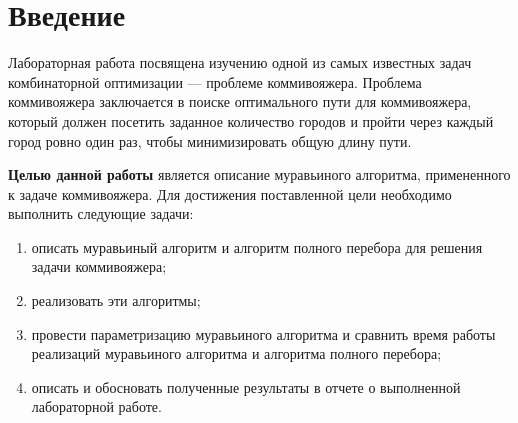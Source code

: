 \chapter*{Введение}

Лабораторная работа посвящена изучению одной из самых известных задач комбинаторной оптимизации --- проблеме коммивояжера. Проблема коммивояжера заключается в поиске оптимального пути для коммивояжера, который должен посетить заданное количество городов и пройти через каждый город ровно один раз, чтобы минимизировать общую длину пути.

\textbf{Целью данной работы} является описание муравьиного алгоритма, примененного к задаче коммивояжера. 
Для достижения поставленной цели необходимо выполнить следующие задачи:
\begin{enumerate}[label=\arabic*)]
	\item описать муравьиный алгоритм и алгоритм полного перебора для решения задачи коммивояжера;
	\item реализовать эти алгоритмы;
	\item провести параметризацию муравьиного алгоритма и сравнить время работы реализаций муравьиного алгоритма и алгоритма полного перебора;
    \item описать и обосновать полученные результаты в отчете о выполненной лабораторной работе.
\end{enumerate}
